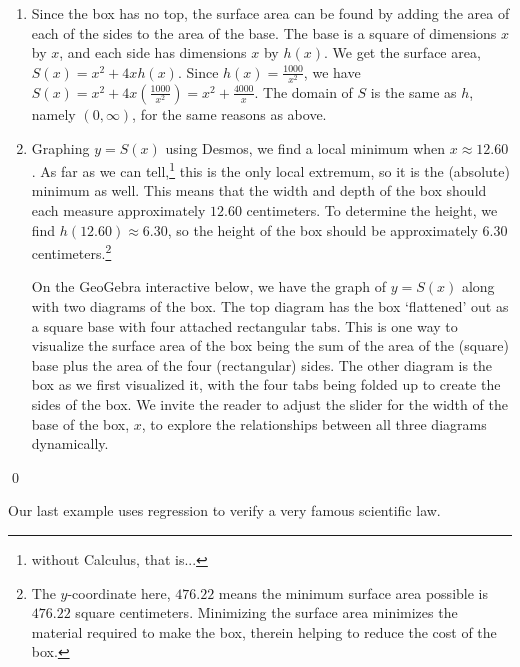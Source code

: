 \documentclass{ximera}
\begin{document}
\begin{example}
\begin{enumerate}
\item  Since the box has no top, the surface area can be found by adding the area of each of the sides to the area of the base.  The base is a square of dimensions $x$ by $x$, and each side has dimensions $x$ by $h(x)$.  We get the surface area, $S(x) = x^2+4xh(x)$.  Since $h(x) = \frac{1000}{x^2}$, we have  $S(x) = x^2+4x \left( \frac{1000}{x^2}\right)= x^2 + \frac{4000}{x}$.  The domain of $S$ is the same as $h$, namely $(0, \infty)$, for the same reasons as above.

\item   Graphing $y = S(x)$ using Desmos, we find a local minimum when $x \approx 12.60$.  As far as we can tell,\footnote{without Calculus, that is...} this is the only local extremum, so it is the (absolute) minimum as well. This means that the width and depth of the box should each measure approximately $12.60$ centimeters.  To determine the height, we find $h(12.60) \approx 6.30$, so the height of the box should be approximately $6.30$ centimeters.\footnote{The $y$-coordinate here, $476.22$ means the minimum surface area possible is $476.22$ square centimeters.  Minimizing the surface area minimizes the material required to make the box, therein helping to reduce the cost of the box.}

On the GeoGebra interactive below, we have the graph of $y = S(x)$ along with two diagrams of the box.  The top diagram has the box `flattened' out as a square base with four attached rectangular tabs.  This is one way to visualize the surface area of the box being the sum of the area of the (square) base plus the area of the four (rectangular) sides.  The other diagram is the box as we first visualized it, with the four tabs being folded up to create the sides of the box.  We invite the reader to adjust the slider for the width of the base of the box, $x$, to explore the relationships between all three diagrams dynamically.

\begin{center}
\end{center}

\end{enumerate}
\qed

\end{example}

Our last example uses regression to verify a very famous scientific law.
\end{document}
